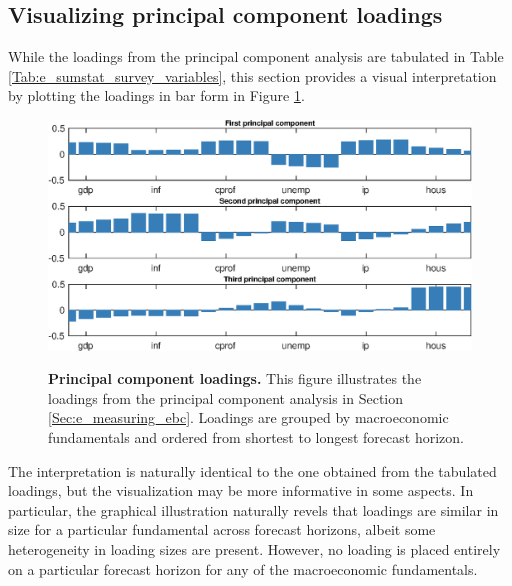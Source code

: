 \documentclass[12pt,letterpaper,leqno,doublespacing]{article}
\begin{document}
\begin{appendices}

\clearpage
\section{Visualizing principal component loadings}\label{sec:visualizing_principal_component_loaings}
While the loadings from the principal component analysis are tabulated in Table \ref{Tab:e_sumstat_survey_variables}, this section provides a visual interpretation by plotting the loadings in bar form in Figure \ref{Fig:e_pca_loadings}.
\begin{figure}[htbp]
    \caption{
        \textbf{Principal component loadings.} \newline
        This figure illustrates the loadings from the principal component analysis in Section \ref{Sec:e_measuring_ebc}. Loadings are grouped by macroeconomic fundamentals and ordered from shortest to longest forecast horizon. 
    }
    \centering
    \includegraphics[scale=0.8]{figures/e_pca_loadings.eps}
    \label{Fig:e_pca_loadings}
\end{figure}
The interpretation is naturally identical to the one obtained from the tabulated loadings, but the visualization may be more informative in some aspects. In particular, the graphical illustration naturally revels that loadings are similar in size for a particular fundamental across forecast horizons, albeit some heterogeneity in loading sizes are present. However, no loading is placed entirely on a particular forecast horizon for any of the macroeconomic fundamentals. 


\end{appendices}
\end{document}
